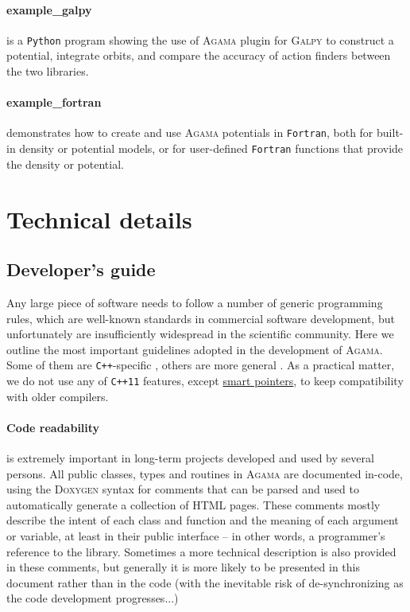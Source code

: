 \documentclass[12pt]{article}
\newcommand{\Agama}{\textsc{Agama}\xspace}
\newcommand{\Galpy}{\textsc{Galpy}\xspace}
\newcommand{\Cpp}  {\texttt{C++}\xspace}
\newcommand{\CppII}{\texttt{C++11}\xspace}
\newcommand{\Python}{\texttt{Python}\xspace}
\newcommand{\Fortran}{\texttt{Fortran}\xspace}
\begin{document}
\paragraph{example_galpy} is a \Python program showing the use of \Agama plugin for \Galpy to construct a potential, integrate orbits, and compare the accuracy of action finders between the two libraries. 

\paragraph{example_fortran} demonstrates how to create and use \Agama potentials in \Fortran, both for built-in density or potential models, or for user-defined \Fortran functions that provide the density or potential.

\newpage
\appendix

\section{Technical details}

\subsection{Developer's guide}  \label{sec:DeveloperGuide}

Any large piece of software needs to follow a number of generic programming rules, which are well-known standards in commercial software development, but unfortunately are insufficiently widespread in the scientific community. Here we outline the most important guidelines adopted in the development of \Agama. Some of them are \Cpp-specific \cite{Meyers,SutterAlexandrescu}, others are more general \cite{Martin,McConnell}.
As a practical matter, we do not use any of \CppII features, except \hyperref[sec:SmartPointers]{smart pointers}, to keep compatibility with older compilers.

\paragraph{Code readability} is extremely important in long-term projects developed and used by several persons. All public classes, types and routines in \Agama are documented in-code, using the \textsc{Doxygen} syntax for comments that can be parsed and used to automatically generate a collection of HTML pages. These comments mostly describe the intent of each class and function and the meaning of each argument or variable, at least in their public interface -- in other words, a programmer's reference to the library. Sometimes a more technical description is also provided in these comments, but generally it is more likely to be presented in this document rather than in the code (with the inevitable risk of de-synchronizing as the code development progresses...)
\end{document}
